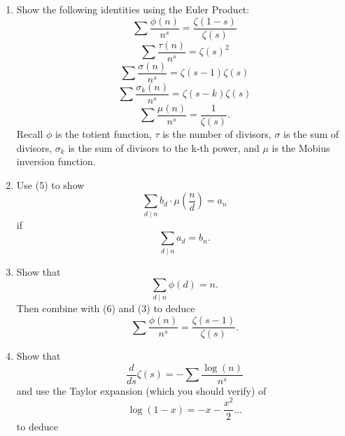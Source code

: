 \documentclass[12pt]{article}
\begin{document}
\begin{enumerate}
    \item Show the following identities using the Euler Product:
    \begin{equation}
        \sum \frac{\phi(n)}{n^{s}} = \frac{\zeta(1-s)}{\zeta(s)}
    \end{equation}
    \begin{equation}
        \sum \frac{\tau(n)}{n^{s}} = \zeta(s)^{2}
    \end{equation}
    \begin{equation}
        \sum \frac{\sigma(n)}{n^{s}} = \zeta(s-1)\zeta(s)
    \end{equation}
    \begin{equation}
        \sum \frac{\sigma_{k}(n)}{n^{s}} = \zeta(s-k)\zeta(s)
    \end{equation}
    \begin{equation}
        \sum \frac{\mu(n)}{n^{s}} = \frac{1}{\zeta(s)}.
    \end{equation}
    Recall $\phi$ is the totient function, $\tau$ is the number of divisors, $\sigma$ is the sum of divisors, $\sigma_{k}$ is the sum of divisors to the k-th power, and $\mu$ is the Mobius inversion function.
    \item Use (5) to show
    \begin{equation}
        \sum_{d \mid n}b_{d} \cdot \mu(\frac{n}{d}) = a_{n}
    \end{equation}
    if
    \begin{equation*}
        \sum_{d \mid n}a_{d} = b_{n}.
    \end{equation*}
    \item Show that
    \begin{equation}
        \sum_{d \mid n} \phi(d) = n. 
    \end{equation}
    Then combine with (6) and (3) to deduce
    \begin{equation}
        \sum \frac{\phi(n)}{n^{s}} = \frac{\zeta(s-1)}{\zeta(s)}.
    \end{equation}
    \item Show that
    \begin{equation}
        \frac{d}{ds}\zeta(s) = -\sum\frac{\log(n)}{n^{s}}
    \end{equation}
    and use the Taylor expansion (which you should verify) of
    \begin{equation}
        \log(1-x) = -x - \frac{x^{2}}{2} ...
    \end{equation}
    to deduce

\end{enumerate}
\end{document}
